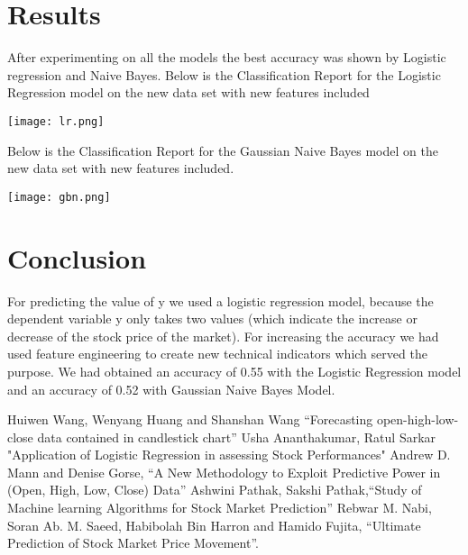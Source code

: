 \documentclass[conference]{IEEEtran}
\begin{document}
\section{Results}
After experimenting on all the models the best accuracy was shown by Logistic regression and Naive Bayes. Below is the Classification Report for the Logistic Regression model on the new data set with new features included
\centerline{\texttt{[image: lr.png]}}

Below is the Classification Report for the Gaussian Naive Bayes model on the new data set with new features included.
\centerline{\texttt{[image: gbn.png]}}

\section{Conclusion}
For predicting the value of y we used a logistic regression model, because the dependent variable y only takes two values (which indicate the increase or decrease of the stock price of the market). For increasing the accuracy we had used feature engineering to create new technical indicators which served the purpose. We had obtained an accuracy of 0.55 with the Logistic Regression model and an accuracy of 0.52 with Gaussian Naive Bayes Model.

\begin{thebibliography}{00}
 Huiwen Wang, Wenyang Huang and Shanshan Wang ``Forecasting open-high-low-close data contained in candlestick chart'' 
 Usha Ananthakumar, Ratul Sarkar "Application of Logistic Regression in assessing Stock Performances"
 Andrew D. Mann and Denise Gorse, ``A New Methodology to Exploit Predictive
Power in (Open, High, Low, Close) Data''
 Ashwini Pathak, Sakshi Pathak,``Study of Machine learning Algorithms for Stock 
Market Prediction''
 Rebwar M. Nabi, Soran Ab. M. Saeed, Habibolah Bin Harron and Hamido Fujita, ``Ultimate Prediction of Stock Market Price Movement''.
\end{thebibliography}
\vspace{12pt}
\end{document}
